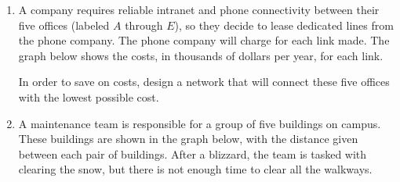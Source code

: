 \begin{enumerate}
\item A company requires reliable intranet and phone connectivity between their five offices (labeled $A$ through $E$), so they decide to lease dedicated lines from the phone company.  The phone company will charge for each link made.  The graph below shows the costs, in thousands of dollars per year, for each link.
\begin{center}
\end{center}
In order to save on costs, design a network that will connect these five offices with the lowest possible cost. 
\begin{center}
\end{center}

\item A maintenance team is responsible for a group of five buildings on campus.  These buildings are shown in the graph below, with the distance given between each pair of buildings.  After a blizzard, the team is tasked with clearing the snow, but there is not enough time to clear all the walkways.
\begin{center}
\end{center}
\end{enumerate}

